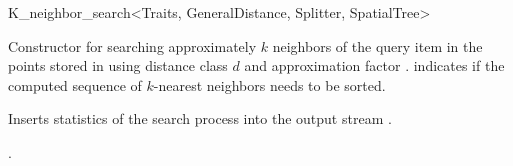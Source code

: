 \begin{ccRefClass}{K_neighbor_search<Traits, GeneralDistance, Splitter, SpatialTree>}
\ccCreation
{}  %


\def\ccLongParamLayout{\ccTrue}
{Constructor for searching approximately $k$ neighbors of the query item  
in the points stored in  using 
distance class $d$ and approximation factor .  indicates
if the computed sequence of $k$-nearest neighbors needs to be sorted.}

\ccOperations





\begin{ccAdvanced}
{
Inserts statistics of the search process into the output stream .
}
\end{ccAdvanced}

\ccSeeAlso

.

\end{ccRefClass}


